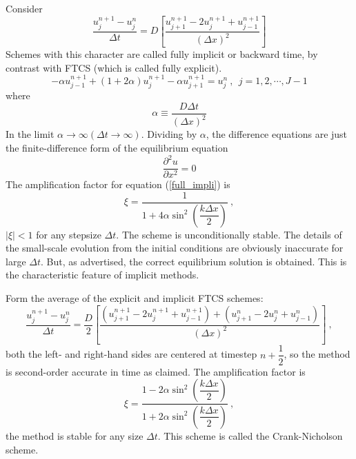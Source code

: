 \documentclass[12pt,a4paper]{article}
\begin{document}
Consider
\begin{equation}
\frac{u_j^{n+1} -u_j^{n}}{\Delta t} = D \left[\frac{u_{j+1}^{n+1} -2u_j^{n+1} +u_{j-1}^{n+1}}{(\Delta x)^2} \right]
\label{full_impli}
\end{equation}
Schemes with this character are called fully implicit or backward time, by contrast with FTCS (which is called fully
explicit). 
\begin{equation}
-\alpha u_{j-1}^{n+1} +(1+2\alpha)u_j^{n+1} -\alpha u_{j+1}^{n+1} = u_j^n ~, ~~ j = 1, 2, \cdots, J-1
\end{equation}
where
\begin{equation}
\alpha \equiv \frac{D \Delta t}{(\Delta x)^2} 
\end{equation}
In the limit $\alpha \rightarrow \infty (\Delta t \rightarrow \infty)$. Dividing by $\alpha$, the difference equations are just the finite-difference form of the equilibrium equation
\begin{equation}
\frac{\partial^2 u}{\partial x^2} = 0 
\end{equation}
The amplification factor for equation (\ref{full_impli}) is
\begin{equation}
\xi = \frac{1}{1+4\alpha \sin^2 \left(\dfrac{k \Delta x}{2} \right) } ~,
\end{equation}
$|\xi| < 1$ for any stepsize $\Delta t$. The scheme is unconditionally stable. The details of the small-scale evolution from the initial conditions are obviously inaccurate for large $\Delta t$. But, as advertised, the correct equilibrium solution is obtained. This is the characteristic feature of implicit methods.

Form the average of the explicit and implicit FTCS schemes:
\begin{equation}
\frac{u_j^{n+1} -u_j^{n}}{\Delta t} = \frac{D}{2} \left[\frac{(u_{j+1}^{n+1} -2u_j^{n+1} +u_{j-1}^{n+1}) +(u_{j+1}^{n} -2u_j^{n} +u_{j-1}^{n}) }{(\Delta x)^2} \right] ~,
\end{equation}
both the left- and right-hand sides are centered at timestep $n + \dfrac{1}{2}$, so the method is second-order accurate in time as claimed. The amplification factor is
\begin{equation}
\xi = \frac{1-2\alpha \sin^2 \left(\dfrac{k \Delta x}{2} \right)}{1+2\alpha \sin^2 \left(\dfrac{k \Delta x}{2} \right) } ~,
\end{equation}
the method is stable for any size $\Delta t$. This scheme is called the Crank-Nicholson scheme.
\end{document}
